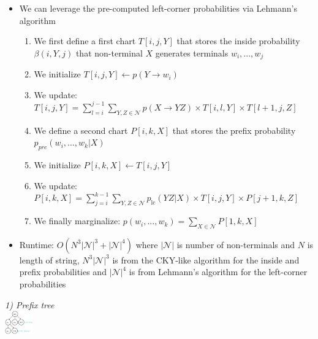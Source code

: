 \begin{itemize}
    \item We can leverage the pre-computed left-corner probabilities via Lehmann's algorithm
    \begin{enumerate}
        \item We first define a first chart $T[i,j,Y]$ that stores the inside probability $\beta(i,Y,j)$ that non-terminal $X$ generates terminals $w_i,...,w_j$
        \item We initialize $T[i,j,Y] \gets p(Y \to w_i)$
        \item We update: $T[i,j,Y] = \sum_{l=i}^{j-1} \sum_{Y,Z \in \mathcal{N}} p(X \to YZ) \times T[i,l,Y] \times T[l+1,j,Z]$
        \item We define a second chart $P[i,k,X]$ that stores the prefix probability $p_{pre}(w_i,...,w_k | X)$
        \item We initialize $P[i,k,X] \gets T[i,j,Y]$
        \item We update: $P[i,k,X] = \sum_{j=i}^{k-1} \sum_{Y,Z \in \mathcal{N}} p_{\text{lc}} (YZ |X) \times T[i,j,Y] \times P[j+1,k,Z]$
        \item We finally marginalize: $p(w_i,...,w_k) = \sum_{X \in \mathcal{N}} P[1,k,X]$
    \end{enumerate}
    \item Runtime: $O(N^3|\mathcal{N}|^3 +|\mathcal{N}|^4)$ where $|\mathcal{N}|$ is number of non-terminals and $N$ is length of string, $N^3|\mathcal{N}|^3$ is from the CKY-like algorithm for the inside and prefix probabilities and $|\mathcal{N}|^4$ is from Lehmann's algorithm for the left-corner probabilities
\end{itemize}

\begin{multicols}{2}
\textit{1) Prefix tree}\\
\includegraphics[height=10mm]{inhalt/images/NLP/06_language_models_1.png}
\end{multicols}